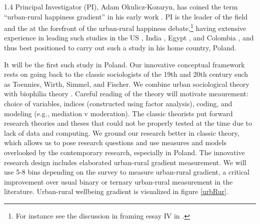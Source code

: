 \documentclass[10pt, letterpaper]{article}
\begin{document}
\begin{spacing}{1.4}
Principal Investigator (PI), Adam Okulicz-Kozaryn, has coined the term ``urban-rural happiness gradient''
in his early work \citep{aok11a}. PI is the leader of the field and the at the
forefront of the urban-rural happiness debate,\footnote{For instance see the
  discussion in framing essay IV in \citet{johansen22}.} having extensive
experience in leading such studies in
the US \citep{aok-ls_fisher16,growShrink25,aokcities}, India \citep{deb23}, Egypt \citep{ebshoyEgypt24}, and Colombia \citep{unhappyBog26}, and thus best positioned to
carry out such a study in his home country, Poland.



\noindent %

It will be the first such study in Poland.
 Our innovative conceptual framework rests on going back to the 
 classic sociologists of the 19th and 20th century such as Toennies, Wirth, Simmel,
 and Fischer.
 We combine urban sociological theory with biophilia theory \citep{maryanski92,pretty12}.
 Careful reading of the theory will motivate meaurement: choice
 of variables, indices (constructed using factor analysis), coding, and modeling
 (e.g., mediation v moderation). The classic theorists put forward research theories and
theses that could not be properly tested at the time due to lack of data and computing.
We ground our research better in classic theory, which allows us to pose research
questions and use measures and models  overlooked by the contemporary research,
especially in Poland. 
The innovative %
 research design includes elaborated urban-rural gradient
measurement.
 We will use 5-8 bins depending on the survey %
to measure urban-rural gradient, a critical 
improvement over usual binary or ternary urban-rural measurement in the literature.
 Urban-rural wellbeing gradient is visualized in figure \ref{urbRur}.


\end{spacing}
\end{document}
